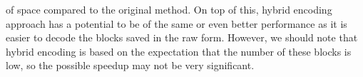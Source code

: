 of space compared to the original method. On top of this, hybrid encoding approach has a potential
to be of the same or even better performance as it is easier to decode the blocks
saved in the raw form. However, we should note that hybrid encoding is based on the expectation
that the number of these blocks is low, so the possible speedup may not be very significant.
